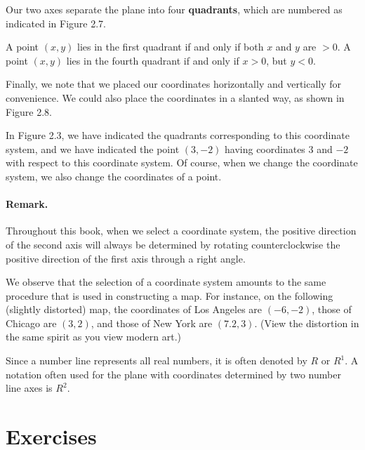 \documentclass[12pt]{book} %
\begin{document}
Our two axes separate the plane into four \textbf{quadrants}, which are numbered as indicated in Figure 2.7.


A point $(x,y)$ lies in the first quadrant if and only if both $x$ and $y$ are $>0$. A point $(x,y)$ lies in the fourth quadrant if and only if $x>0$, but $y<0$.

Finally, we note that we placed our coordinates horizontally and vertically for convenience. We could also place the coordinates in a slanted way, as shown in Figure 2.8.


In Figure 2.3, we have indicated the quadrants corresponding to this coordinate system, and we have indicated the point $(3,-2)$ having coordinates $3$ and $-2$ with respect to this coordinate system. Of course, when we change the coordinate system, we also change the coordinates of a point.

\paragraph{Remark.}
Throughout this book, when we select a coordinate system, the positive direction of the second axis will always be determined by rotating counterclockwise the positive direction of the first axis through a right angle.

We observe that the selection of a coordinate system amounts to the same procedure that is used in constructing a map. For instance, on the following (slightly distorted) map, the coordinates of Los Angeles are $(-6,-2)$, those of Chicago are $(3,2)$, and those of New York are $(7.2,3)$. (View the distortion in the same spirit as you view modern art.)


Since a number line represents all real numbers, it is often denoted by $R$ or $R^1$. A notation often used for the plane with coordinates determined by two number line axes is $R^2$.

\section*{Exercises}
\end{document}
